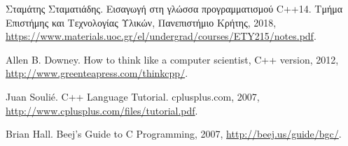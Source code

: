 \begin{thebibliography}{9}
Σταμάτης Σταματιάδης. Εισαγωγή στη γλώσσα προγραμματισμού C++14. Τμήμα Επιστήμης και Τεχνολογίας Υλικών, Πανεπιστήμιο Κρήτης, 2018, \href{https://www.materials.uoc.gr/el/undergrad/courses/ETY215/notes.pdf}{https://www.materials.uoc.gr/el/undergrad/courses/ETY215/notes.pdf}.

Allen B. Downey. How to think like a computer scientist, C++ version, 2012, \href{http://www.greenteapress.com/thinkcpp/}{http://www.greenteapress.com/thinkcpp/}. 

Juan Souli\'e. C++ Language Tutorial. cplusplus.com, 2007, \href{http://www.cplusplus.com/files/tutorial.pdf}{http://www.cplusplus.com/files/tutorial.pdf}.

Brian Hall. Beej's Guide to C Programming, 2007, \href{http://beej.us/guide/bgc/}{http://beej.us/guide/bgc/}.

\end{thebibliography}
